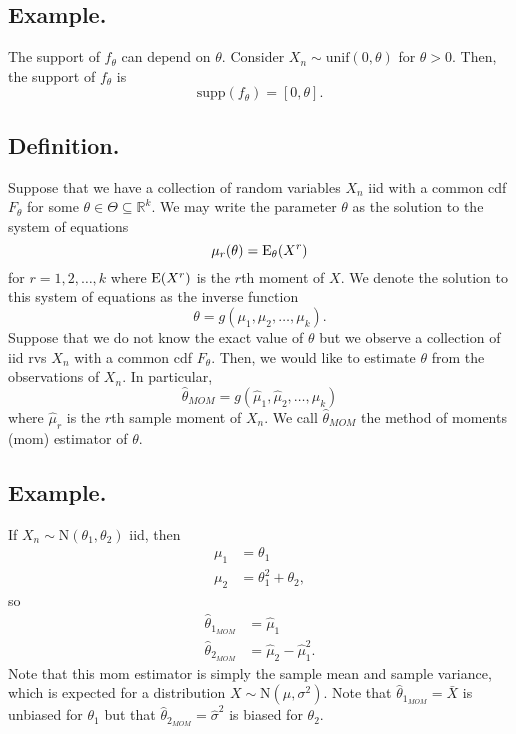 \documentclass[titlepage]{article}
\begin{document}
\subsection{Example.} The support of $f_{\theta}$ can depend on $\theta$. Consider $X_{n} \sim \text{unif}(0, \theta)$ for $\theta > 0$. Then, the support of $f_{\theta}$ is
$$\text{supp}(f_{\theta}) = [0, \theta].$$

\subsection{Definition.} Suppose that we have a collection of random variables $X_{n}$ iid with a common cdf $F_{\theta}$ for some $\theta \in \Theta \subseteq \mathbb{R}^{k}$. We may write the parameter $\theta$ as the solution to the system of equations 
$$\mu_{r}(\theta) = \text{E}_{\theta}(X^{r})$$
for $r = 1, 2, \ldots, k$ where $\text{E}(X^{r})$ is the $r$th moment of $X$. We denote the solution to this system of equations as the inverse function 
$$\theta = g(\mu_{1}, \mu_{2}, \ldots, \mu_{k}).$$
Suppose that we do not know the exact value of $\theta$ but we observe a collection of iid rvs $X_{n}$ with a common cdf $F_{\theta}$. Then, we would like to estimate $\theta$ from the observations of $X_{n}$. In particular, 
$$\hat{\theta}_{MOM} = g(\hat{\mu}_{1}, \hat{\mu}_{2}, \ldots, \hat{\mu}_{k})$$
where $\hat{\mu}_{r}$ is the $r$th sample moment of $X_{n}$. We call $\hat{\theta}_{MOM}$ the method of moments (mom) estimator of $\theta$.

\subsection{Example.} If $X_{n} \sim \text{N}(\theta_{1}, \theta_{2})$ iid, then 
\begin{align*}
    \mu_{1} &= \theta_{1} \\
    \mu_{2} &= \theta_{1}^{2} + \theta_{2},
\end{align*}
so 
\begin{align*}
    \hat{\theta}_{1_{MOM}} &= \hat{\mu}_{1} \\
    \hat{\theta}_{2_{MOM}} &= \hat{\mu}_{2} - \hat{\mu}_{1}^{2}.
\end{align*}
Note that this mom estimator is simply the sample mean and sample variance, which is expected for a distribution $X \sim \text{N}(\mu, \sigma^{2})$. Note that $\hat{\theta}_{1_{MOM}} = \bar{X}$ is unbiased for $\theta_{1}$ but that $\hat{\theta}_{2_{MOM}} = \hat{\sigma}^{2}$ is biased for $\theta_{2}$.
\end{document}
